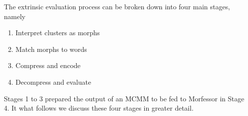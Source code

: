 {The extrinsic evaluation process can be broken down into four main stages, namely
\begin{enumerate}
\item Interpret clusters as morphs
\item Match morphs to words
\item Compress and encode
\item Decompress and evaluate
\end{enumerate}
Stages 1 to 3 prepared the output of an MCMM to be fed to Morfessor in Stage 4. 
It what follows we discuss these four stages in
 greater detail. %
}
